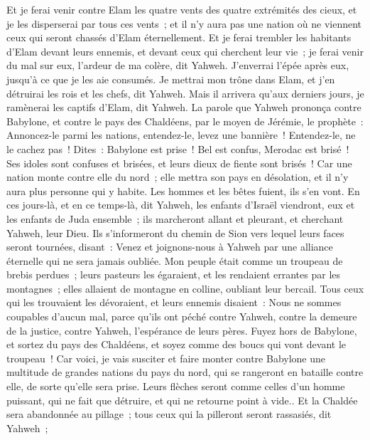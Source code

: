 \begin{multicols}{2}
Et je ferai venir contre Elam les quatre vents des quatre extrémités des cieux, et je les disperserai par tous ces vents~; et il n'y aura pas une nation où ne viennent ceux qui seront chassés d'Elam éternellement.
Et je ferai trembler les habitants d'Elam devant leurs ennemis, et devant ceux qui cherchent leur vie~; je ferai venir du mal sur eux, l'ardeur de ma colère, dit Yahweh. J'enverrai l'épée après eux, jusqu'à ce que je les aie consumés.
Je mettrai mon trône dans Elam, et j'en détruirai les rois et les chefs, dit Yahweh.
Mais il arrivera qu'aux derniers jours, je ramènerai les captifs d'Elam, dit Yahweh.
\VerseOne{}La parole que Yahweh prononça contre Babylone, et contre le pays des Chaldéens, par le moyen de Jérémie, le prophète~:
Annoncez-le parmi les nations, entendez-le, levez une bannière~! Entendez-le, ne le cachez pas~! Dites~: Babylone est prise~! Bel est confus, Merodac est brisé~! Ses idoles sont confuses et brisées, et leurs dieux de fiente sont brisés~!
Car une nation monte contre elle du nord~; elle mettra son pays en désolation, et il n'y aura plus personne qui y habite. Les hommes et les bêtes fuient, ils s'en vont.
En ces jours-là, et en ce temps-là, dit Yahweh, les enfants d'Israël viendront, eux et les enfants de Juda ensemble~; ils marcheront allant et pleurant, et cherchant Yahweh, leur Dieu.
Ils s'informeront du chemin de Sion vers lequel leurs faces seront tournées, disant~: Venez et joignons-nous à Yahweh par une alliance éternelle qui ne sera jamais oubliée.
Mon peuple était comme un troupeau de brebis perdues~; leurs pasteurs les égaraient, et les rendaient errantes par les montagnes~; elles allaient de montagne en colline, oubliant leur bercail.
Tous ceux qui les trouvaient les dévoraient, et leurs ennemis disaient~: Nous ne sommes coupables d'aucun mal, parce qu'ils ont péché contre Yahweh, contre la demeure de la justice, contre Yahweh, l'espérance de leurs pères.
Fuyez hors de Babylone, et sortez du pays des Chaldéens, et soyez comme des boucs qui vont devant le troupeau~!
Car voici, je vais susciter et faire monter contre Babylone une multitude de grandes nations du pays du nord, qui se rangeront en bataille contre elle, de sorte qu'elle sera prise. Leurs flèches seront comme celles d'un homme puissant, qui ne fait que détruire, et qui ne retourne point à vide..
Et la Chaldée sera abandonnée au pillage~; tous ceux qui la pilleront seront rassasiés, dit Yahweh~;

\end{multicols}
